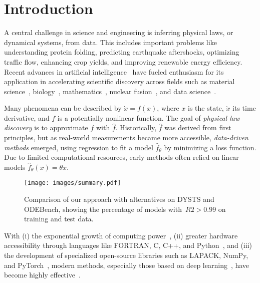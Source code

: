 \documentclass{article}
\begin{document}
\section{Introduction}



A central challenge in science and engineering is inferring physical laws, or dynamical systems, from data. 
This includes important problems like understanding protein folding, predicting earthquake aftershocks, optimizing traffic flow, enhancing crop yields, and improving renewable energy efficiency. 
Recent advances in artificial intelligence~\cite{krizhevsky2012imagenet, LeCun2015, Mnih2015, Vaswani17} have fueled enthusiasm for its application in accelerating scientific discovery across fields such as material science~\cite{Fang18}, biology~\cite{Jumper2021}, mathematics~\cite{Davies2021}, nuclear fusion~\cite{Degrave2022}, and data science~\cite{grosnit2024largelanguagemodelsorchestrating}.

Many phenomena can be described by $\dot{x} = f(x)$, where $x$ is the state, $\dot{x}$ its time derivative, and $f$ is a potentially nonlinear function. 
The goal of \textit{physical law discovery} is to approximate $f$ with $\widehat{f}$. 
Historically, $\widehat{f}$ was derived from first principles, but as real-world measurements became more accessible, \textit{data-driven methods} emerged, using regression to fit a model $\widehat{f}_\theta$ by minimizing a loss function. 
Due to limited computational resources, early methods often relied on linear models $\widehat{f}_\theta(x) = \theta x$.

\begin{figure}
    \centering
    \texttt{[image: images/summary.pdf]}
    \caption{Comparison of our approach with alternatives on DYSTS and ODEBench, showing the percentage of models with~$R2 > 0.99$ on training and test data.}
    \label{fig:overal}
\end{figure}

With 
(i) the exponential growth of computing power~\cite{Nordhaus_2007, Thompson23}, 
(ii) greater hardware accessibility through languages like FORTRAN, C, C++, and Python~\cite{huang2024programming}, and 
(iii) the development of specialized open-source libraries such as LAPACK, NumPy, and PyTorch~\cite{Langenkamp22}, 
modern methods, especially those based on deep learning~\cite{LeCun2015}, have become highly effective~\cite{wehmeyer2018time, mardt2018vampnets, vlachas2018data, pathak2018model, raissi2019physics, champion2019data, raissi2020hidden, yang2020physics, lu2021deepxde}.
\end{document}
